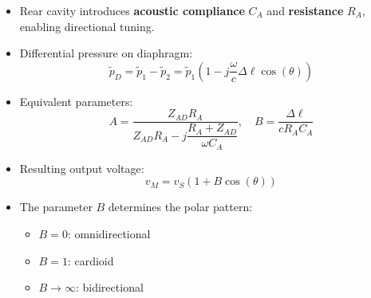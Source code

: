 \begin{tcolorbox}[colback=gray!10!white,colframe=black,title=\textbf{Summary – Combined Pressure + Pressure Gradient Microphones}]
\begin{itemize}
    \item Rear cavity introduces \textbf{acoustic compliance} \( C_A \) and \textbf{resistance} \( R_A \), enabling directional tuning.
    \item Differential pressure on diaphragm:
    \[
    \tilde{p}_D = \tilde{p}_1 - \tilde{p}_2 = \tilde{p}_1 \left( 1 - j\dfrac{\omega}{c}\Delta \ell \cos(\theta) \right)
    \]
    \item Equivalent parameters:
    \[
    A = \frac{Z_{AD} R_A}{Z_{AD} R_A - j\dfrac{R_A + Z_{AD}}{\omega C_A}}, \quad B = \frac{\Delta \ell}{c R_A C_A}
    \]
    \item Resulting output voltage:
    \[
    v_M = v_S (1 + B\cos(\theta))
    \]
    \item The parameter \( B \) determines the polar pattern:
    \begin{itemize}
        \item \( B = 0 \): omnidirectional
        \item \( B = 1 \): cardioid
        \item \( B \rightarrow \infty \): bidirectional
    \end{itemize}
\end{itemize}
\end{tcolorbox}